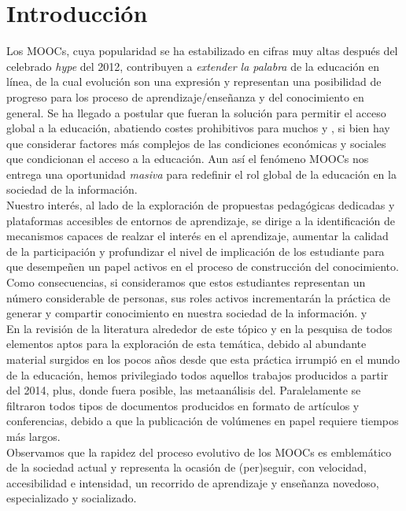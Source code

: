 \documentclass[11pt]{article}
\begin{document}
\section{Introducción}
Los MOOCs, cuya popularidad se ha estabilizado en cifras muy altas después del celebrado \textit{hype} del 2012, contribuyen a \textit {extender la palabra} de la educación en línea, de la cual evolución son una expresión y representan una posibilidad de progreso para los proceso de aprendizaje/enseñanza y del conocimiento en general. Se ha llegado a postular que fueran la solución para permitir el acceso global a la educación, abatiendo costes prohibitivos para muchos \citep{meta} y \citep{Nrb17}, si bien hay que considerar factores más complejos de las condiciones económicas y sociales que condicionan el acceso a la educación. Aun así el fenómeno MOOCs nos entrega una oportunidad \textit {masiva} para redefinir el rol global de la educación en la sociedad de la información.
\\ Nuestro interés, al lado de la exploración de propuestas pedagógicas dedicadas y plataformas accesibles de entornos de aprendizaje, se dirige a la identificación de mecanismos capaces de realzar el interés en el aprendizaje, aumentar la calidad de la participación y profundizar el nivel de implicación de los estudiante para que desempeñen un papel activos en el proceso de construcción del conocimiento.
\\Como consecuencias, si consideramos que estos estudiantes representan un número considerable de personas, sus roles activos incrementarán la práctica de generar y compartir conocimiento en nuestra sociedad de la información.\citep{Dow12} y \citep{kop11}
\\En la revisión de la literatura alrededor de este tópico y en la pesquisa de todos elementos aptos para la exploración de esta temática, debido al  abundante material surgidos en los pocos años desde que esta práctica irrumpió en el mundo de la educación, hemos privilegiado todos aquellos trabajos producidos a partir del 2014, plus, donde fuera posible, las  metaanálisis del. Paralelamente se filtraron todos tipos de documentos producidos en formato de artículos y conferencias, debido a que la publicación de volúmenes en papel requiere tiempos más largos. \\Observamos que la rapidez del proceso evolutivo de los MOOCs es emblemático de la sociedad actual y representa la ocasión de (per)seguir, con  velocidad, accesibilidad e intensidad, un recorrido de aprendizaje y enseñanza novedoso, especializado y socializado.
\end{document}
